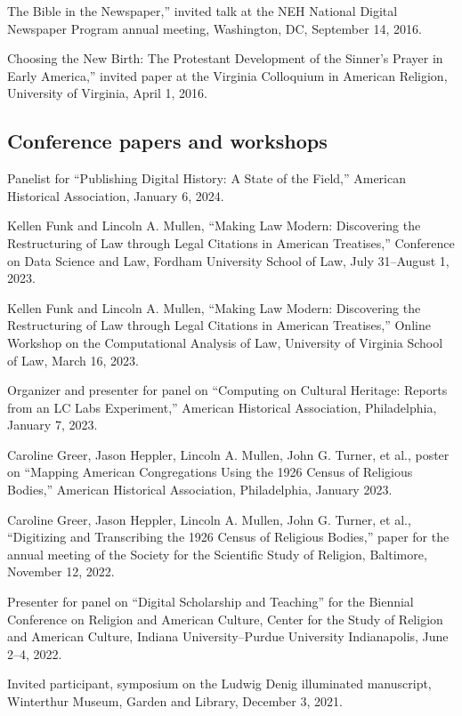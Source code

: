 \documentclass[11pt]{article}
\begin{document}
\noindent{}The Bible in the Newspaper,'' invited talk at the NEH National Digital Newspaper Program annual meeting, Washington, DC, September 14, 2016.

\noindent{}Choosing the New Birth: The Protestant Development of the Sinner's Prayer in Early America,'' invited paper at the Virginia Colloquium in American Religion, University of Virginia, April 1, 2016.

\subsection{Conference papers and workshops}\label{Conference papers}

Panelist for ``Publishing Digital History: A State of the Field,'' American Historical Association, January 6, 2024.

Kellen Funk and Lincoln A. Mullen, ``Making Law Modern: Discovering the Restructuring of Law through Legal Citations in American Treatises,'' Conference on Data Science and Law, Fordham University School of Law, July 31--August 1, 2023.  

Kellen Funk and Lincoln A. Mullen, ``Making Law Modern: Discovering the Restructuring of Law through Legal Citations in American Treatises,'' Online Workshop on the Computational Analysis of Law, University of Virginia School of Law, March 16, 2023.  

Organizer and presenter for panel on ``Computing on Cultural Heritage: Reports from an LC Labs Experiment,'' American Historical Association, Philadelphia, January 7, 2023.

Caroline Greer, Jason Heppler, Lincoln A. Mullen, John G. Turner, et al., poster on ``Mapping American Congregations Using the 1926 Census of Religious Bodies,'' American Historical Association, Philadelphia, January 2023.

Caroline Greer, Jason Heppler, Lincoln A. Mullen, John G. Turner, et al., ``Digitizing and Transcribing the 1926 Census of Religious Bodies,'' paper for the annual meeting of the Society for the Scientific Study of Religion, Baltimore, November 12, 2022.

Presenter for panel on ``Digital Scholarship and Teaching'' for the Biennial Conference on Religion and American Culture, Center for the Study of Religion and American Culture, Indiana University–Purdue University Indianapolis, June 2--4, 2022.

Invited participant, symposium on the Ludwig Denig illuminated manuscript, Winterthur Museum, Garden and Library, December 3, 2021.
\end{document}

